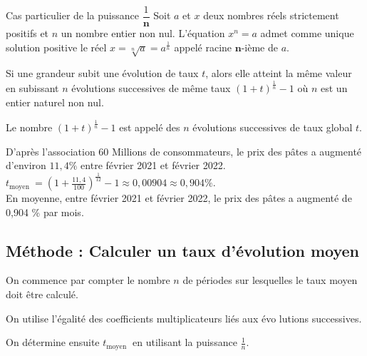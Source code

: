\begin{proprieteTitre}{Cas particulier de la puissance $\dfrac{1}{\boldsymbol{n}}$}
Soit $a$ et $x$ deux nombres réels strictement positifs et $n$ un nombre entier non nul. L'équation $x^n=a$ admet comme unique solution positive le réel $x=\sqrt[n]{a}=a^{\frac{1}{n}}$ appelé racine $\boldsymbol{n}$-ième de $a$.
\end{proprieteTitre}

\begin{propriete}
	Si une grandeur subit une évolution de taux $t$, alors elle atteint la même valeur en subissant $n$ évolutions successives de même taux $(1+t)^{\frac{1}{n}}-1$ où $n$ est un entier naturel non nul.
\end{propriete}


\begin{definition}
	Le nombre $(1+t)^{\frac{1}{n}}-1$ est appelé  des $n$ évolutions successives de taux global $t$.
\end{definition}

\begin{exemple}
	D'après l'association 60 Millions de consommateurs, le prix des pâtes a augmenté d'environ $11,4 \%$ entre février 2021 et février 2022.\\ $t_{\text {moyen }}=\left(1+\frac{11,4}{100}\right)^{\frac{1}{12}}-1 \approx 0,00904 \approx 0,904 \%$.\\
	En moyenne, entre février 2021 et février 2022, le prix des pâtes a augmenté de 0,904 \% par mois.
\end{exemple}

\newpage

\subsection{Méthode : Calculer un taux d'évolution moyen}

\begin{methode}
	\begin{enumMet}
		\item On commence par compter le nombre $n$ de périodes sur lesquelles le taux moyen doit être calculé.
		\item On utilise l'égalité des coefficients multiplicateurs liés aux évo lutions successives.
		\item On détermine ensuite $t_{\text {moyen }}$ en utilisant la puissance $\frac{1}{n}$.
	\end{enumMet}
\end{methode}

